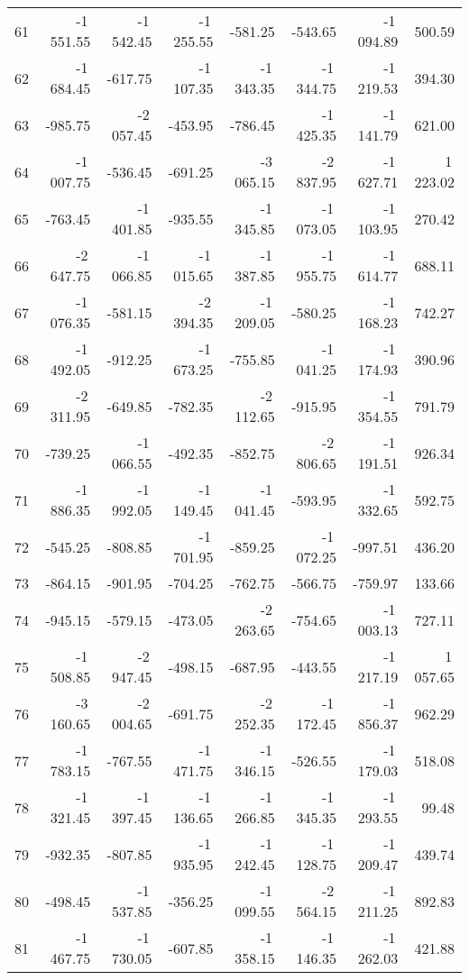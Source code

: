 \begin{longtable}{rrrrrrrr}
61 & -1\,551.55 & -1\,542.45 & -1\,255.55 & -581.25 & -543.65 & -1\,094.89 & 500.59  \\
62 & -1\,684.45 & -617.75 & -1\,107.35 & -1\,343.35 & -1\,344.75 & -1\,219.53 & 394.30  \\
63 & -985.75 & -2\,057.45 & -453.95 & -786.45 & -1\,425.35 & -1\,141.79 & 621.00  \\
64 & -1\,007.75 & -536.45 & -691.25 & -3\,065.15 & -2\,837.95 & -1\,627.71 & 1\,223.02  \\
65 & -763.45 & -1\,401.85 & -935.55 & -1\,345.85 & -1\,073.05 & -1\,103.95 & 270.42  \\
66 & -2\,647.75 & -1\,066.85 & -1\,015.65 & -1\,387.85 & -1\,955.75 & -1\,614.77 & 688.11  \\
67 & -1\,076.35 & -581.15 & -2\,394.35 & -1\,209.05 & -580.25 & -1\,168.23 & 742.27  \\
68 & -1\,492.05 & -912.25 & -1\,673.25 & -755.85 & -1\,041.25 & -1\,174.93 & 390.96  \\
69 & -2\,311.95 & -649.85 & -782.35 & -2\,112.65 & -915.95 & -1\,354.55 & 791.79  \\
70 & -739.25 & -1\,066.55 & -492.35 & -852.75 & -2\,806.65 & -1\,191.51 & 926.34  \\
71 & -1\,886.35 & -1\,992.05 & -1\,149.45 & -1\,041.45 & -593.95 & -1\,332.65 & 592.75  \\
72 & -545.25 & -808.85 & -1\,701.95 & -859.25 & -1\,072.25 & -997.51 & 436.20  \\
73 & -864.15 & -901.95 & -704.25 & -762.75 & -566.75 & -759.97 & 133.66  \\
74 & -945.15 & -579.15 & -473.05 & -2\,263.65 & -754.65 & -1\,003.13 & 727.11  \\
75 & -1\,508.85 & -2\,947.45 & -498.15 & -687.95 & -443.55 & -1\,217.19 & 1\,057.65  \\
76 & -3\,160.65 & -2\,004.65 & -691.75 & -2\,252.35 & -1\,172.45 & -1\,856.37 & 962.29  \\
77 & -1\,783.15 & -767.55 & -1\,471.75 & -1\,346.15 & -526.55 & -1\,179.03 & 518.08  \\
78 & -1\,321.45 & -1\,397.45 & -1\,136.65 & -1\,266.85 & -1\,345.35 & -1\,293.55 & 99.48  \\
79 & -932.35 & -807.85 & -1\,935.95 & -1\,242.45 & -1\,128.75 & -1\,209.47 & 439.74  \\
80 & -498.45 & -1\,537.85 & -356.25 & -1\,099.55 & -2\,564.15 & -1\,211.25 & 892.83  \\
81 & -1\,467.75 & -1\,730.05 & -607.85 & -1\,358.15 & -1\,146.35 & -1\,262.03 & 421.88  \\

\end{longtable}
